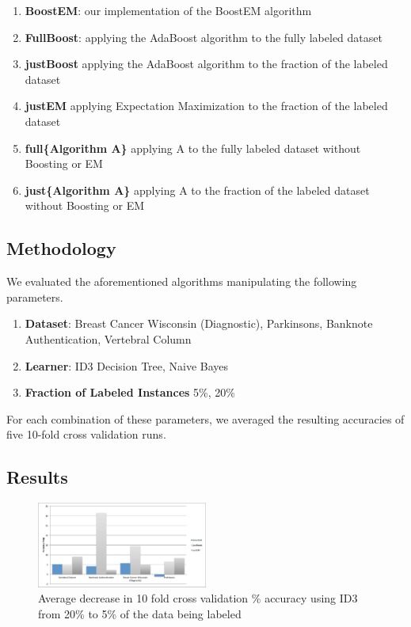 \documentclass{sig-alternate}
\begin{document}
\begin{enumerate}
\item \textbf{BoostEM}: our implementation of the BoostEM algorithm
\item \textbf{FullBoost}: applying the AdaBoost algorithm to the fully labeled dataset
\item \textbf{justBoost} applying the AdaBoost algorithm to the fraction of the labeled dataset
\item \textbf{justEM} applying Expectation Maximization to the fraction of the labeled dataset
\item \textbf{full\{Algorithm A\}} applying A to the fully labeled dataset without Boosting or EM
\item \textbf{just\{Algorithm A\}} applying A to the fraction of the labeled dataset without Boosting or EM
\end{enumerate}

\subsection{Methodology}

We evaluated the aforementioned algorithms manipulating the following parameters.

\begin{enumerate}
\item \textbf{Dataset}: Breast Cancer Wisconsin (Diagnostic), Parkinsons, Banknote Authentication, Vertebral Column
\item \textbf{Learner}: ID3 Decision Tree, Naive Bayes
\item \textbf{Fraction of Labeled Instances} 5\%, 20\%
\end{enumerate}

For each combination of these parameters, we averaged the resulting accuracies of five 10-fold cross validation runs. 

\subsection{Results}


 \begin{figure}
\centering
\includegraphics[width=0.5\textwidth]{figures/accDrops.pdf}
\caption{Average decrease in 10 fold cross validation \% accuracy using ID3 from 20\% to 5\% of the data being labeled}
\label{accDrop}
\end{figure}
 
\end{document}
